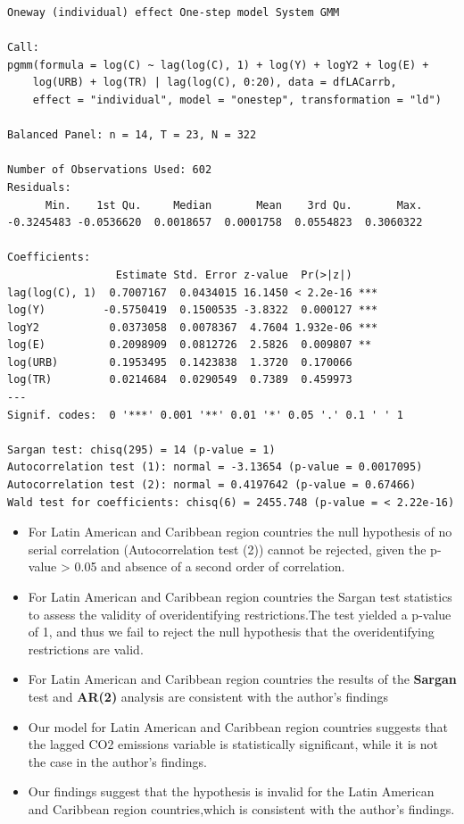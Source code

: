 \documentclass[
  11pt,
]{article}
\begin{document}
\begin{verbatim}
Oneway (individual) effect One-step model System GMM 

Call:
pgmm(formula = log(C) ~ lag(log(C), 1) + log(Y) + logY2 + log(E) + 
    log(URB) + log(TR) | lag(log(C), 0:20), data = dfLACarrb, 
    effect = "individual", model = "onestep", transformation = "ld")

Balanced Panel: n = 14, T = 23, N = 322

Number of Observations Used: 602
Residuals:
      Min.    1st Qu.     Median       Mean    3rd Qu.       Max. 
-0.3245483 -0.0536620  0.0018657  0.0001758  0.0554823  0.3060322 

Coefficients:
                 Estimate Std. Error z-value  Pr(>|z|)    
lag(log(C), 1)  0.7007167  0.0434015 16.1450 < 2.2e-16 ***
log(Y)         -0.5750419  0.1500535 -3.8322  0.000127 ***
logY2           0.0373058  0.0078367  4.7604 1.932e-06 ***
log(E)          0.2098909  0.0812726  2.5826  0.009807 ** 
log(URB)        0.1953495  0.1423838  1.3720  0.170066    
log(TR)         0.0214684  0.0290549  0.7389  0.459973    
---
Signif. codes:  0 '***' 0.001 '**' 0.01 '*' 0.05 '.' 0.1 ' ' 1

Sargan test: chisq(295) = 14 (p-value = 1)
Autocorrelation test (1): normal = -3.13654 (p-value = 0.0017095)
Autocorrelation test (2): normal = 0.4197642 (p-value = 0.67466)
Wald test for coefficients: chisq(6) = 2455.748 (p-value = < 2.22e-16)
\end{verbatim}

\begin{itemize}
\item
  For Latin American and Caribbean region countries the null hypothesis
  of no serial correlation (Autocorrelation test (2)) cannot be
  rejected, given the p-value \textgreater{} 0.05 and absence of a
  second order of correlation.
\item
  For Latin American and Caribbean region countries the Sargan test
  statistics to assess the validity of overidentifying restrictions.The
  test yielded a p-value of 1, and thus we fail to reject the null
  hypothesis that the overidentifying restrictions are valid.
\item
  For Latin American and Caribbean region countries the results of the
  \textbf{Sargan} test and \textbf{AR(2)} analysis are consistent with
  the author's findings
\item
  Our model for Latin American and Caribbean region countries suggests
  that the lagged CO2 emissions variable is statistically significant,
  while it is not the case in the author's findings.
\item
  Our findings suggest that the hypothesis is invalid for the Latin
  American and Caribbean region countries,which is consistent with the
  author's findings.
\end{itemize}
\end{document}

